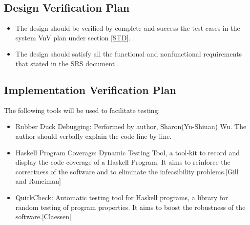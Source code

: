 \documentclass[12pt, titlepage]{article}
\begin{document}

\subsection{Design Verification Plan}
\begin{itemize}

\item The design should be verified by complete and success the test cases in
the system VnV plan under section \ref{STD}.
\item The design should satisfy all the functional and nonfunctional
requirements that stated in the SRS document \cite{YS2019}.

\end{itemize}

\label{Planfordv}

\subsection{Implementation Verification Plan} 
The following tools will be used to facilitate testing: 

\begin{itemize}
\item[ ]Rubber Duck Debugging: Performed by author, Sharon(Yu-Shiuan) Wu. The 
author should verbally explain the code line by line.
\item[ ]Haskell Program Coverage: Dynamic Testing Tool, a tool-kit to record 
and display the code coverage of a Haskell Program. It aims to reinforce the 
correctness of the software and to eliminate the infeasibility problems.[Gill
and Runciman] \cite{GillandRunciman}
\item[ ]QuickCheck: Automatic testing tool for Haskell programs, a library for
random testing of program properties. It aims to boost the robustness of the 
software.[Claessen] \cite{QuickCheck}
		
\end{itemize} 

 
\end{document}
